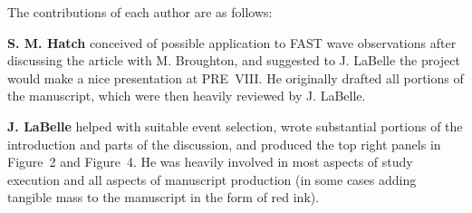 The contributions of each author are as follows:

\textbf{S. M. Hatch} conceived of possible application to FAST \Alf wave
observations after discussing the article with M. Broughton, and suggested to
J. LaBelle the project would make a nice presentation at PRE~VIII. He originally
drafted all portions of the manuscript, which were then heavily reviewed by
J. LaBelle.

\textbf{J. LaBelle} helped with suitable event selection, wrote substantial
portions of the introduction and parts of the discussion, and produced the top
right panels in Figure~2 and Figure~4. He was heavily involved in most aspects
of study execution and all aspects of manuscript production (in some cases
adding tangible mass to the manuscript in the form of red ink).



\restoregeometry
    

